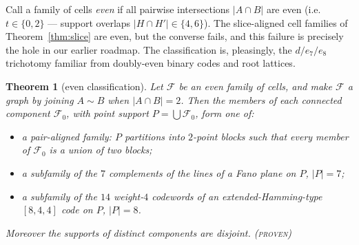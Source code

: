 \documentclass[11pt]{article}
\newtheorem{theorem}{Theorem}
\theoremstyle{remark}
\begin{document}
Call a family of cells \emph{even} if all pairwise intersections
$|A\cap B|$ are even (i.e.\ $t\in\{0,2\}$ --- support overlaps
$|H\cap H'|\in\{4,6\}$). The slice-aligned cell families of
Theorem~\ref{thm:slice} are even, but the converse fails, and this failure
is precisely the hole in our earlier roadmap. The classification is,
pleasingly, the $d/e_7/e_8$ trichotomy familiar from doubly-even binary
codes and root lattices.

\begin{theorem}[even classification]\label{thm:evenclass}
Let $\mathcal F$ be an even family of cells, and make $\mathcal F$ a graph
by joining $A\sim B$ when $|A\cap B|=2$. Then the members of each
connected component $\mathcal F_0$, with point support
$P=\bigcup\mathcal F_0$, form one of:
\begin{itemize}
\item[\textup{(d)}] a \emph{pair-aligned} family: $P$ partitions into
$2$-point blocks such that every member of $\mathcal F_0$ is a union of
two blocks;
\item[\textup{(e7)}] a subfamily of the $7$ complements of the lines of a
Fano plane on $P$, $|P|=7$;
\item[\textup{(e8)}] a subfamily of the $14$ weight-$4$ codewords of an
extended-Hamming-type $[8,4,4]$ code on $P$, $|P|=8$.
\end{itemize}
Moreover the supports of distinct components are disjoint.
\textsc{(proven)}
\end{theorem}
\end{document}

